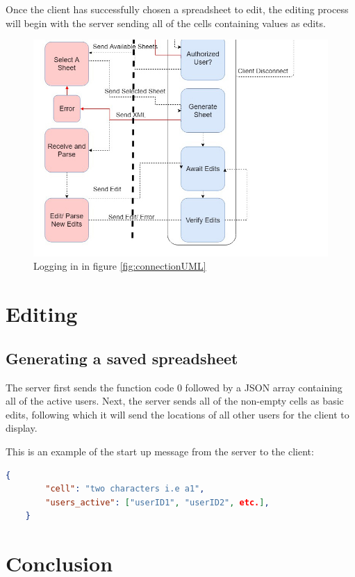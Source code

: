 \documentclass[titlepage]{article}
\begin{document}
        Once the client has successfully chosen a spreadsheet to edit, the editing process will begin with the server
        sending all of the cells containing values as edits. 

        \begin{figure}[h!]
            \centering
            \includegraphics[width=.9\linewidth]{2-4}
            \caption{Logging in in figure \ref{fig:connectionUML}}
            \label{fig:loginUML}
        \end{figure}
            
\section{Editing}
\subsection{Generating a saved spreadsheet}
    The server first sends the function code 0 followed by a JSON array containing all of the active users. Next, the server sends all of the non-empty cells as basic edits, following which it will send the locations of all other users for the client to display.  

    This is an example of the start up message from the server to the client:

    \begin{lstlisting}[language=json,firstnumber=1]
    {
        "cell": "two characters i.e a1",
        "users_active": ["userID1", "userID2", etc.],        
    }
    \end{lstlisting}
    

\section{Conclusion}
\end{document}
